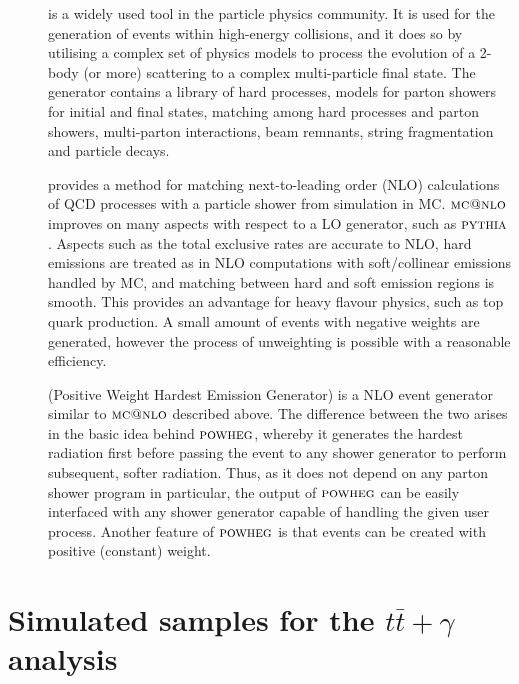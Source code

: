 \begin{description}
	\item[\PYTHIA] \cite{1126-6708-2006-05-026} is a widely used tool in the particle physics community. It is used for the generation of events within high-energy collisions, and it does so by utilising a complex set of physics models to process the evolution of a 2-body (or more) scattering to a complex multi-particle final state. The generator contains a library of hard processes, models for parton showers for initial and final states, matching among hard processes and parton showers, multi-parton interactions, beam remnants, string fragmentation and particle decays.  

	\item[\MCATNLO] \cite{1126-6708-2002-06-029} provides a method for matching next-to-leading order (NLO) calculations of QCD processes with a particle shower from simulation in MC. $\textsc{mc@nlo}$ improves on many aspects with respect to a LO generator, such as ${\textsc{pythia}}$. Aspects such as the total exclusive rates are accurate to NLO, hard emissions are treated as in NLO computations with soft/collinear emissions handled by MC, and matching between hard and soft emission regions is smooth. This provides an advantage for heavy flavour physics, such as top quark production. A small amount of events with negative weights are generated, however the process of unweighting is possible with a reasonable efficiency. 

	\item[\POWHEG] \cite{1126-6708-2007-11-070} (Positive Weight Hardest Emission Generator) is a NLO event generator similar to $\textsc{mc@nlo}$ described above. The difference between the two arises in the basic idea behind ${\textsc{powheg}}$, whereby it generates the hardest radiation first before passing the event to any shower generator to perform subsequent, softer radiation. Thus, as it does not depend on any parton shower program in particular, the output of ${\textsc{powheg}}$ can be easily interfaced with any shower generator capable of handling the given user process. Another feature of ${\textsc{powheg}}$ is that events can be created with positive (constant) weight.  


\end{description}	

\section{Simulated samples for the $t\bar{t}+\gamma$ analysis}

